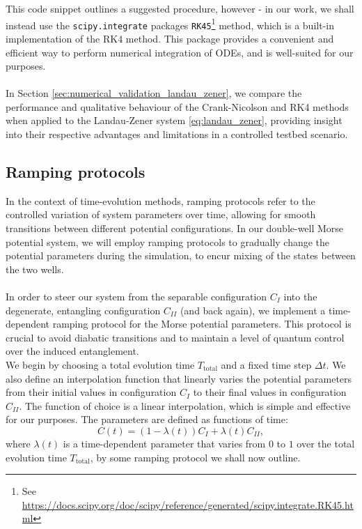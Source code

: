 \documentclass{subfiles}
\begin{document}
This code snippet outlines a suggested procedure, however - in our work, we shall instead use the \texttt{scipy.integrate} packages \texttt{RK45}\footnote{See \url{https://docs.scipy.org/doc/scipy/reference/generated/scipy.integrate.RK45.html}} method, which is a built-in implementation of the RK4 method. This package provides a convenient and efficient way to perform numerical integration of ODEs, and is well-suited for our purposes.  \\\\
In Section \ref{sec:numerical_validation_landau_zener}, we compare the performance and qualitative behaviour of the Crank-Nicolson and RK4 methods when applied to the Landau-Zener system \eqref{eq:landau_zener}, providing insight into their respective advantages and limitations in a controlled testbed scenario.

\subsection{Ramping protocols}\label{sec:ramping_protocols}
In the context of time-evolution methods, ramping protocols refer to the controlled variation of system parameters over time, allowing for smooth transitions between different potential configurations. In our double-well Morse potential system, we will employ ramping protocols to gradually change the potential parameters during the simulation, to encur mixing of the states between the two wells. \\\\
In order to steer our system from the separable configuration $C_I$ into the degenerate, entangling configuration $C_{II}$ (and back again), we implement a time-dependent ramping protocol for the Morse potential parameters. This protocol is crucial to avoid diabatic transitions and to maintain a level of quantum control over the induced entanglement.
\\
We begin by choosing a total evolution time $T_\text{total}$ and a fixed time step $\Delta t$. We also define an interpolation function that linearly varies the potential parameters from their initial values in configuration $C_I$ to their final values in configuration $C_{II}$. The function of choice is a linear interpolation, which is simple and effective for our purposes. The parameters are defined as functions of time:
\begin{equation}
    C(t) = (1 - \lambda(t))C_I + \lambda(t)C_{II}\label{eq:interpolation_function},
\end{equation}
where $\lambda(t)$ is a time-dependent parameter that varies from $0$ to $1$ over the total evolution time $T_\text{total}$, by some ramping protocol we shall now outline.\\
\end{document}
